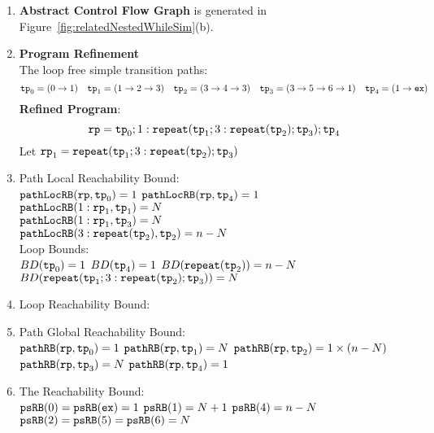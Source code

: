 \begin{enumerate}
  \item  \textbf{Abstract Control Flow Graph} is generated in Figure~\ref{fig:relatedNestedWhileSim}(b).

  \item \textbf{Program Refinement}
  \\
  The loop free simple transition paths:
  \[
          \mathtt{tp}_0 = (0 \to 1)
          \quad
          \mathtt{tp}_1 = (1 \to 2 \to 3)
          \quad           
          \mathtt{tp}_2 = (3 \to 4 \to 3)
          \quad
          \mathtt{tp}_3 = (3 \to 5 \to 6 \to 1)
          \quad
          \mathtt{tp}_4 = (1 \to \mathtt{ex})
      \]
  \textbf{Refined Program}:
  \[
  \mathtt{rp} = \mathtt{tp}_0 ; 1: \mathtt{repeat}(\mathtt{tp}_1; 3: \mathtt{repeat}(\mathtt{tp}_2); \mathtt{tp}_3); \mathtt{tp}_4
  \]
 Let $\mathtt{rp}_1 = \mathtt{repeat}(\mathtt{tp}_1; 3: \mathtt{repeat}(\mathtt{tp}_2); \mathtt{tp}_3)$
\item {Path Local Reachability Bound}:
\\
$\mathtt{pathLocRB}(\mathtt{rp}, \mathtt{tp}_0) = 1$ \quad
$\mathtt{pathLocRB}(\mathtt{rp}, \mathtt{tp}_4) = 1$ \\
$\mathtt{pathLocRB}(1: \mathtt{rp}_1, \mathtt{tp}_1) = N$ \\
$\mathtt{pathLocRB}(1: \mathtt{rp}_1, \mathtt{tp}_3) = N$ \\
$\mathtt{pathLocRB}(3: \mathtt{repeat}(\mathtt{tp}_2), \mathtt{tp}_2) = n - N$ 
\\
Loop Bounds:
\\
$BD(\mathtt{tp}_0) = 1$
\quad
$BD(\mathtt{tp}_4) = 1$
\quad
$BD(\mathtt{repeat}(\mathtt{tp}_2)) = n - N $
\\
$BD(\mathtt{repeat}(\mathtt{tp}_1; 3: \mathtt{repeat}(\mathtt{tp}_2); \mathtt{tp}_3)) = N $
%
\item Loop Reachability Bound:
\\
%
%
\item Path Global Reachability Bound:
\\
$\mathtt{pathRB}(\mathtt{rp}, \mathtt{tp}_0) = 1$ \quad
$\mathtt{pathRB}(\mathtt{rp}, \mathtt{tp}_1) = N$ \quad
$\mathtt{pathRB}(\mathtt{rp}, \mathtt{tp}_2) = 1 \times (n - N)$ \\
$\mathtt{pathRB}(\mathtt{rp}, \mathtt{tp}_3) = N$ \quad
$\mathtt{pathRB}(\mathtt{rp}, \mathtt{tp}_4) = 1$
%
\item The Reachability Bound:
\\
$\mathtt{psRB}(0) = \mathtt{psRB}(\mathtt{ex}) = 1$ \quad
$\mathtt{psRB}(1) = N + 1$ \quad
$\mathtt{psRB}(4) = n - N$ \quad \\
$\mathtt{psRB}(2) = \mathtt{psRB}(5) =  \mathtt{psRB}(6) = N$ \quad
{}
\end{enumerate}